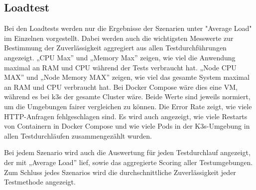 \subsection{Loadtest}
Bei den Loadtests werden nur die Ergebnisse der Szenarien unter "Average Load" im Einzelnen vorgestellt.
Dabei werden auch die wichtigsten Messwerte zur Bestimmung der Zuverlässigkeit aggregiert aus allen Testdurchführungen angezeigt.
„CPU Max” und „Memory Max” zeigen, wie viel die Anwendung maximal an RAM und CPU während der Tests verbraucht hat.
„Node CPU MAX” und „Node Memory MAX” zeigen, wie viel das gesamte System maximal an RAM und CPU verbraucht hat. Bei Docker Compose wäre dies eine VM, während es bei k3s der gesamte Cluster wäre.
Beide Werte sind jeweils normiert, um die Umgebungen fairer vergleichen zu können.
Die Error Rate zeigt, wie viele HTTP-Anfragen fehlgeschlagen sind.
Es wird auch angezeigt, wie viele Restarts von Containern in Docker Compose und wie viele Pods in der K3s-Umgebung in allen Testdurchläufen zusammengezählt wurden.

Bei jedem Szenario wird auch die Auswertung für jeden Testdurchlauf angezeigt, der mit „Average Load” lief, sowie das aggregierte Scoring aller Testumgebungen.
Zum Schluss jedes Szenarios wird die durchschnittliche Zuverlässigkeit jeder Testmethode angezeigt.


